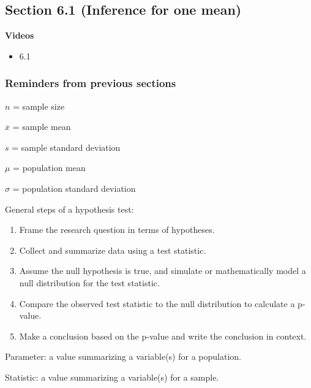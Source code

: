 \documentclass[
]{report}
\providecommand{\tightlist}{%
  \setlength{\itemsep}{0pt}\setlength{\parskip}{0pt}}
\begin{document}
\hypertarget{section-6.1-inference-for-one-mean}{%
\subsection*{Section 6.1 (Inference for one mean)}\label{section-6.1-inference-for-one-mean}}

\textbf{Videos}

\begin{itemize}
\tightlist
\item
  6.1
\end{itemize}


\hypertarget{reminders-from-previous-sections-5}{%
\subsubsection*{Reminders from previous sections}\label{reminders-from-previous-sections-5}}

\(n\) = sample size

\(\overline{x}\) = sample mean

\(s\) = sample standard deviation

\(\mu\) = population mean

\(\sigma\) = population standard deviation

General steps of a hypothesis test:

\begin{enumerate}
\def\labelenumi{\arabic{enumi}.}
\item
  Frame the research question in terms of hypotheses.
\item
  Collect and summarize data using a test statistic.
\item
  Assume the null hypothesis is true, and simulate or mathematically model a null distribution for the test statistic.
\item
  Compare the observed test statistic to the null distribution to calculate a p-value.
\item
  Make a conclusion based on the p-value and write the conclusion in context.
\end{enumerate}

Parameter: a value summarizing a variable(s) for a population.

Statistic: a value summarizing a variable(s) for a sample.
\end{document}
